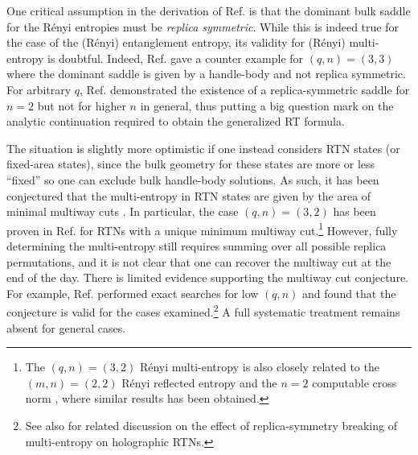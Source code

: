 \documentclass[11pt,oneside,letterpaper]{article}
\numberwithin{equation}{section}
\theoremstyle{definition}
\theoremstyle{remark}
\begin{document}
One critical assumption in the derivation of Ref. \cite{Lewkowycz:2013nqa} is that the dominant bulk saddle for the R\'enyi entropies must be \emph{replica symmetric}. While this is indeed true for the case of the (R\'enyi) entanglement entropy, its validity for (R\'enyi) multi-entropy is doubtful. Indeed, Ref. \cite{Penington:2022dhr} gave a counter example for $(q,n)=(3,3)$ where the dominant saddle is given by a handle-body and not replica symmetric. For arbitrary $q$, Ref. \cite{Gadde:2024taa} demonstrated the existence of a replica-symmetric saddle for $n=2$ but not for higher $n$ in general, thus putting a big question mark on the analytic continuation required to obtain the generalized RT formula.

The situation is slightly more optimistic if one instead considers RTN states (or fixed-area states), since the bulk geometry for these states are more or less ``fixed'' so one can exclude bulk handle-body solutions. As such, it has been conjectured that the multi-entropy in RTN states are given by the area of minimal multiway cuts \cite{Iizuka:2024pzm,Carrozza:2026qcf}. In particular, the case $(q,n)=(3,2)$ has been proven in Ref. \cite{Penington:2022dhr} for RTNs with a unique minimum multiway cut.\footnote{The $(q,n)=(3,2)$ R\'enyi multi-entropy is also closely related to the $(m,n)=(2,2)$ R\'enyi reflected entropy \cite{Akers:2024pgq} and the $n=2$ computable cross norm \cite{Milekhin:2022zsy}, where similar results has been obtained.}
However, fully determining the multi-entropy still requires summing over all possible replica permutations, and it is not clear that one can recover the multiway cut at the end of the day. There is limited evidence supporting the multiway cut conjecture. For example, Ref. \cite{Iizuka:2024pzm} performed exact searches for low $(q,n)$ and found that the conjecture is valid for the cases examined.\footnote{See also \cite{Akella:2026bci} for related discussion on the effect of replica-symmetry breaking of multi-entropy on holographic RTNs.} A full systematic treatment remains absent for general cases.
\end{document}
